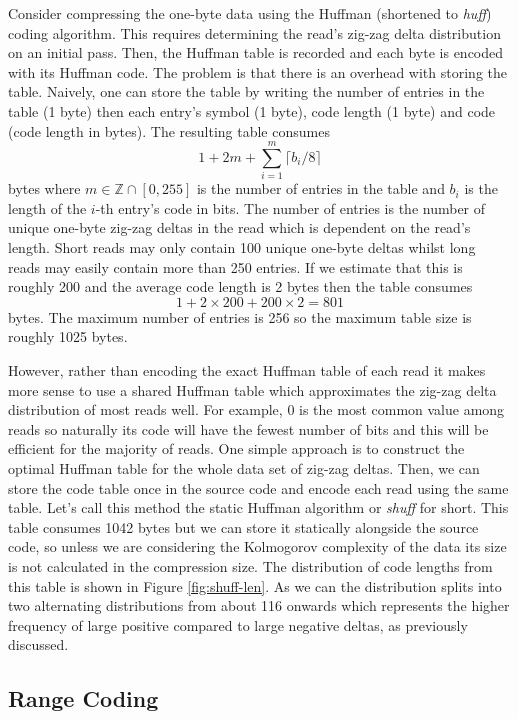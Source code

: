 Consider compressing the one-byte data using the Huffman (shortened to \textit{huff}) coding algorithm. This requires determining the read's zig-zag delta distribution on an initial pass. Then, the Huffman table is recorded and each byte is encoded with its Huffman code. The problem is that there is an overhead with storing the table.
Naively, one can store the table by writing the number of entries in the table (1 byte) then each entry's symbol (1 byte), code length (1 byte) and code (code length in bytes). The resulting table consumes
\[ 1 + 2m + \sum_{i=1}^m\lceil b_i / 8 \rceil \]
bytes where $m\in\mathbb{Z}\cap[0,255]$ is the number of entries in the table and $b_i$ is the length of the $i$-th entry's code in bits. The number of entries is the number of unique one-byte zig-zag deltas in the read which is dependent on the read's length. Short reads may only contain 100 unique one-byte deltas whilst long reads may easily contain more than 250 entries. If we estimate that this is roughly 200 and the average code length is 2 bytes then the table consumes
\[ 1 + 2\times 200 + 200\times 2 = 801 \]
bytes. The maximum number of entries is 256 so the maximum table size is roughly 1025 bytes.

However, rather than encoding the exact Huffman table of each read it makes more sense to use a shared Huffman table which approximates the zig-zag delta distribution of most reads well.
For example, 0 is the most common value among reads so naturally its code will have the fewest number of bits and this will be efficient for the majority of reads. One simple approach is to construct the optimal Huffman table for the whole data set of zig-zag deltas. Then, we can store the code table once in the source code and encode each read using the same table. Let's call this method the static Huffman algorithm or \textit{shuff} for short. This table consumes 1042 bytes but we can store it statically alongside the source code, so unless we are considering the Kolmogorov complexity of the data its size is not calculated in the compression size. The distribution of code lengths from this table is shown in Figure \ref{fig:shuff-len}. As we can the distribution splits into two alternating distributions from about 116 onwards which represents the higher frequency of large positive compared to large negative deltas, as previously discussed.



\subsection{Range Coding}
